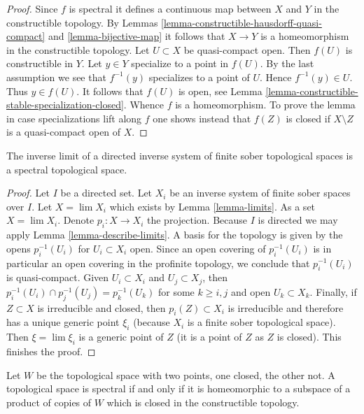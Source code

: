 \begin{proof}
Since $f$ is spectral it defines a continuous map between $X$ and $Y$ in
the constructible topology. By
Lemmas \ref{lemma-constructible-hausdorff-quasi-compact} and
\ref{lemma-bijective-map}
it follows that $X \to Y$ is a homeomorphism in the constructible
topology. Let $U \subset X$ be quasi-compact open.
Then $f(U)$ is constructible in $Y$. Let $y \in Y$ specialize
to a point in $f(U)$. By the last assumption we see that $f^{-1}(y)$
specializes to a point of $U$. Hence $f^{-1}(y) \in U$. Thus $y \in f(U)$.
It follows that $f(U)$ is open, see
Lemma \ref{lemma-constructible-stable-specialization-closed}.
Whence $f$ is a homeomorphism.
To prove the lemma in case specializations lift along $f$
one shows instead that $f(Z)$ is closed if $X \setminus Z$ is a
quasi-compact open of $X$.
\end{proof}

\begin{lemma}
\label{lemma-directed-inverse-limit-finite-sober-spectral-spaces}
The inverse limit of a directed inverse system of finite sober
topological spaces is a spectral topological space.
\end{lemma}

\begin{proof}
Let $I$ be a directed set. Let $X_i$ be an inverse
system of finite sober spaces over $I$. Let $X = \lim X_i$ which exists
by Lemma \ref{lemma-limits}. As a set $X = \lim X_i$. Denote
$p_i : X \to X_i$ the projection.
Because $I$ is directed we may apply Lemma \ref{lemma-describe-limits}.
A basis for the topology is given by the opens
$p_i^{-1}(U_i)$ for $U_i \subset X_i$ open. Since an open covering of
$p_i^{-1}(U_i)$ is in particular an open covering in the profinite
topology, we conclude that $p_i^{-1}(U_i)$ is quasi-compact.
Given $U_i \subset X_i$ and $U_j \subset X_j$, then
$p_i^{-1}(U_i) \cap p_j^{-1}(U_j) = p_k^{-1}(U_k)$
for some $k \geq i, j$ and open $U_k \subset X_k$. Finally, if $Z \subset X$
is irreducible and closed, then $p_i(Z) \subset X_i$ is irreducible
and therefore has a unique generic point $\xi_i$ (because $X_i$
is a finite sober topological space). Then $\xi = \lim \xi_i$ is a
generic point of $Z$ (it is a point of $Z$ as $Z$ is closed).
This finishes the proof.
\end{proof}

\begin{lemma}
\label{lemma-spectral-closed-in-product-two-point-space}
Let $W$ be the topological space with two points, one closed,
the other not. A topological space is spectral if and only if
it is homeomorphic to a subspace of a product of
copies of $W$ which is closed in the constructible topology.
\end{lemma}

